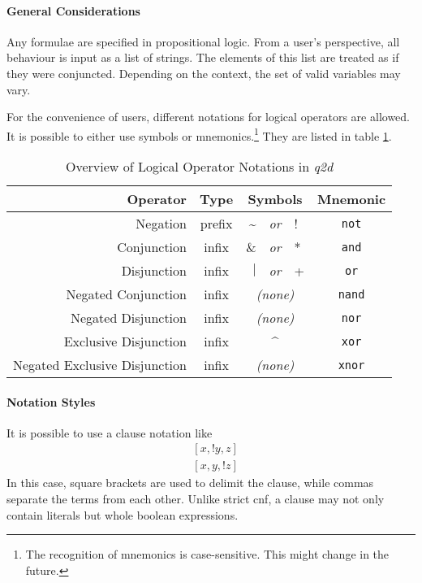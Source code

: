 	\paragraph{General Considerations}
		Any formulae are specified in propositional logic.
		From a user's perspective, all behaviour is input as a list of strings.
		The elements of this list are treated as if they were conjuncted.
		Depending on the context, the set of valid variables may vary.
		
		For the convenience of users, different notations for logical operators are allowed.
		It is possible to either use symbols or mnemonics.\footnote{
			The recognition of mnemonics is case-sensitive.
			This might change in the future.
		}
		They are listed in table \ref{tab-logical-operators}.
		
		\begin{table}
			\centering
			\begin{tabular}{|r|crclc|}
				\hline
				Operator		& Type	& \multicolumn{3}{c}{Symbols}			& Mnemonic		\\
				\hline
				Negation		& prefix	& \textasciitilde \-	& \emph{or}	& !	& \texttt{not}	\\
				Conjunction	& infix	& \&	 				& \emph{or} 	& *	& \texttt{and}	\\
				Disjunction	& infix	& $|$ 				& \emph{or} 	& +	& \texttt{or}	\\
				Negated Conjunction	& infix & \multicolumn{3}{c}{\emph{(none)}}	& \texttt{nand}	\\
				Negated Disjunction	& infix	& \multicolumn{3}{c}{\emph{(none)}}	& \texttt{nor}	\\
				Exclusive Disjunction	&infix	& \multicolumn{3}{c}{\^}	& \texttt{xor}	\\
				Negated Exclusive Disjunction	&infix	& \multicolumn{3}{c}{\emph{(none)}}	& \texttt{xnor}	\\
				\hline
			\end{tabular}
			\caption{Overview of Logical Operator Notations in \emph{q2d}}
			\label{tab-logical-operators}
		\end{table}			
	
	\paragraph{Notation Styles}
		It is possible to use a clause notation like
		\begin{equation}
			\begin{aligned}
			&[ x, !y, z ] \\
			&[ x, y, !z ]
			\end{aligned}
		\label{eqn-styles-cnf}
		\end{equation}
		In this case, square brackets are used to delimit the clause, while commas separate the terms from each other.
		Unlike strict \gls{cnf}, a clause may not only contain literals but whole boolean expressions.
		
